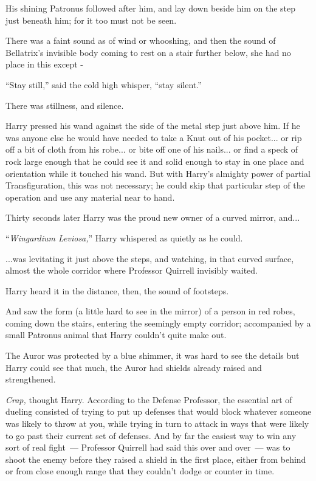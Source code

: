 His shining Patronus followed after him, and lay down beside him on the step just beneath him; for it too must not be seen.

There was a faint sound as of wind or whooshing, and then the sound of Bellatrix's invisible body coming to rest on a stair further below, she had no place in this except -

``Stay still,'' said the cold high whisper, ``stay silent.''

There was stillness, and silence.

Harry pressed his wand against the side of the metal step just above him. If he was anyone else he would have needed to take a Knut out of his pocket... or rip off a bit of cloth from his robe... or bite off one of his nails... or find a speck of rock large enough that he could see it and solid enough to stay in one place and orientation while it touched his wand. But with Harry's almighty power of partial Transfiguration, this was not necessary; he could skip that particular step of the operation and use any material near to hand.

Thirty seconds later Harry was the proud new owner of a curved mirror, and...

``\emph{Wingardium Leviosa,}'' Harry whispered as quietly as he could.

...was levitating it just above the steps, and watching, in that curved surface, almost the whole corridor where Professor Quirrell invisibly waited.

Harry heard it in the distance, then, the sound of footsteps.

And saw the form (a little hard to see in the mirror) of a person in red robes, coming down the stairs, entering the seemingly empty corridor; accompanied by a small Patronus animal that Harry couldn't quite make out.

The Auror was protected by a blue shimmer, it was hard to see the details but Harry could see that much, the Auror had shields already raised and strengthened.

\emph{Crap,} thought Harry. According to the Defense Professor, the essential art of dueling consisted of trying to put up defenses that would block whatever someone was likely to throw at you, while trying in turn to attack in ways that were likely to go past their current set of defenses. And by far the easiest way to win any sort of real fight~--- Professor Quirrell had said this over and over~--- was to shoot the enemy before they raised a shield in the first place, either from behind or from close enough range that they couldn't dodge or counter in time.

